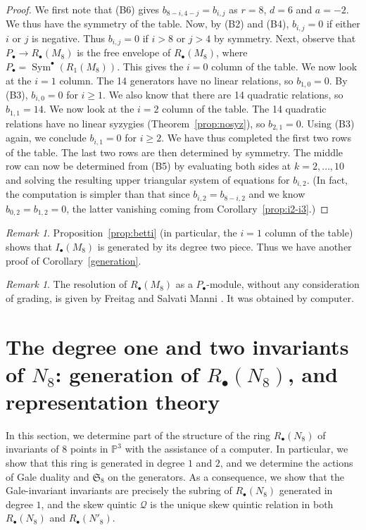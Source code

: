 \documentclass{amsart}
\theoremstyle{definition}
\theoremstyle{remark}
\newtheorem{remark}[theorem]{\it Remark}
\DeclareMathOperator{\Sym}{Sym}
\def\SS{\mathfrak{S}}
\def\proj{\mathbb{P}}
\def\quintic{\mathcal{Q}}
\begin{document}
\begin{proof}
We first note that (B6) gives $b_{8-i, 4-j}=b_{i, j}$ as $r=8$, $d=6$ and $a=-2$.  We thus have the symmetry of the
table. Now, by (B2) and (B4), $b_{i,j}=0$ if either $i$ or $j$ is negative.  Thus  $b_{i,j}=0$ if $i>8$ or $j>4$ by
symmetry.  Next, observe that $P_{\bullet} \to R_{\bullet}(M_8)$ is the free envelope of $R_{\bullet}(M_8)$, where
$P_{\bullet}=\Sym^{\bullet}(R_1(M_8))$.  This gives the $i=0$ column of the table.  We now look at the $i=1$ column.
The 14 generators have no linear relations, so $b_{1,0}=0$.  By (B3), $b_{i,0} =0$ for $i \ge 1$.  We also know that
there are 14 quadratic relations, so $b_{1,1}=14$.  We now look at the $i=2$ column of the table.  The 14 quadratic
relations have no linear syzygies (Theorem~\ref{prop:nosyz}), so $b_{2,1}=0$.  Using (B3) again, we conclude $b_{i,1}=0$
for $i \ge 2$.  We have thus completed the first two rows of the table.  The last two rows are then determined by
symmetry.  The middle row can now be determined from (B5) by evaluating both sides at $k=2, \ldots, 10$ and solving the
resulting upper triangular system of equations for $b_{i,2}$.  (In fact, the computation is simpler than that since
$b_{i,2}=b_{8-i,2}$ and we know $b_{0,2}=b_{1,2}=0$, the latter vanishing coming from Corollary~\ref{prop:i2-i3}.)
\end{proof}

\begin{remark}
\label{r:denver}
Proposition~\ref{prop:betti} (in particular, the $i=1$ column of the table) shows that $I_{\bullet}(M_8)$ is generated
by its degree two piece.  Thus we have another proof of Corollary~\ref{generation}.
\end{remark}

\begin{remark}
The resolution of $R_{\bullet}(M_8)$ as a $P_{\bullet}$-module, without any consideration of grading, is given by
Freitag and Salvati Manni \cite[Lemma~1.3, Theorem~ 1.5]{fs}.  It was obtained by computer.
\end{remark}

\section{The degree one and two invariants of $N_8$: generation of
  $R_{\bullet}(N_8)$, and representation theory}
\label{s:N8}

In this section, we determine part of the structure of the ring
$R_{\bullet}(N_8)$ of invariants of $8$ points in $\proj^3$ with the
assistance of a computer.  In particular, we show that this ring is
generated in degree $1$ and $2$, and we
determine the actions of Gale duality and $\SS_8$ on the generators.
As a consequence, we show that the Gale-invariant invariants are
precisely the subring of $R_{\bullet}(N_8)$ generated in degree $1$,
and the skew quintic $\quintic$ is the unique skew quintic relation in both
$R_{\bullet}(N_8)$ and $R_{\bullet}(N'_8)$.
\end{document}
